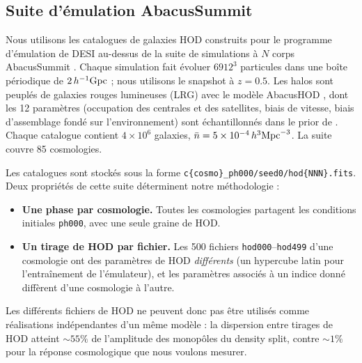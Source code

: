 \subsection{Suite d'émulation AbacusSummit}

Nous utilisons les catalogues de galaxies HOD construits pour le programme d'émulation de DESI au-dessus de la suite de simulations à $N$ corps AbacusSummit \cite{Maksimova2021}. Chaque simulation fait évoluer $6912^3$ particules dans une boîte périodique de $2\,h^{-1}{\rm Gpc}$ ; nous utilisons le snapshot à $z=0.5$. Les halos sont peuplés de galaxies rouges lumineuses (LRG) avec le modèle AbacusHOD \cite{Yuan2022}, dont les 12 paramètres (occupation des centrales et des satellites, biais de vitesse, biais d'assemblage fondé sur l'environnement) sont échantillonnés dans le prior de \cite{Yuan2023}. Chaque catalogue contient $4\times10^6$ galaxies, $\bar n = 5\times10^{-4}\,h^3{\rm Mpc}^{-3}$. La suite couvre 85 cosmologies.

Les catalogues sont stockés sous la forme \texttt{c\{cosmo\}\_ph000/seed0/hod\{NNN\}.fits}. Deux propriétés de cette suite déterminent notre méthodologie :
\begin{itemize}
\item \textbf{Une phase par cosmologie.} Toutes les cosmologies partagent les conditions initiales \texttt{ph000}, avec une seule graine de HOD.
\item \textbf{Un tirage de HOD par fichier.} Les 500 fichiers \texttt{hod000}--\texttt{hod499} d'une cosmologie ont des paramètres de HOD \emph{différents} (un hypercube latin pour l'entraînement de l'émulateur), et les paramètres associés à un indice donné diffèrent d'une cosmologie à l'autre.
\end{itemize}
Les différents fichiers de HOD ne peuvent donc pas être utilisés comme réalisations indépendantes d'un même modèle : la dispersion entre tirages de HOD atteint $\sim55\%$ de l'amplitude des monopôles du density split, contre $\sim1\%$ pour la réponse cosmologique que nous voulons mesurer.

